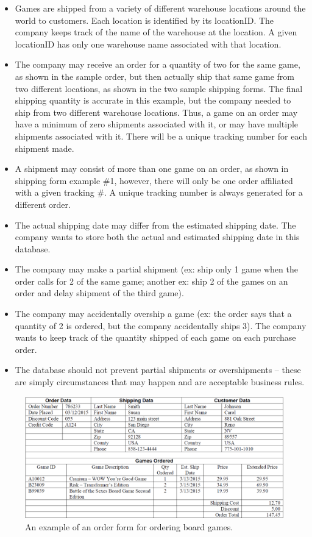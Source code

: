 \documentclass{article}
\begin{document}
\begin{itemize}
  \item Games are shipped from a variety of different warehouse locations around the world to customers. Each location is identified by its locationID. The company keeps track of the name of the warehouse at the location. A given locationID has only one warehouse name associated with that location.
  
  \item The company may receive an order for a quantity of two for the same game, as shown in the sample order, but then actually ship that same game from two different locations, as shown in the two sample shipping forms. The final shipping quantity is accurate in this example, but the company needed to ship from two different warehouse locations. Thus, a game on an order may have a minimum of zero shipments associated with it, or may have multiple shipments associated with it. There will be a unique tracking number for each shipment made.
  
  \item A shipment may consist of more than one game on an order, as shown in shipping form example \#1, however, there will only be one order affiliated with a given tracking \#. A unique tracking number is always generated for a different order.
  
  \item The actual shipping date may differ from the estimated shipping date. The company wants to store both the actual and estimated shipping date in this database.
  
  \item The company may make a partial shipment (ex: ship only 1 game when the order calls for 2 of the same game; another ex: ship 2 of the games on an order and delay shipment of the third game).
  
  \item The company may accidentally overship a game (ex: the order says that a quantity of 2 is ordered, but the company accidentally ships 3). The company wants to keep track of the quantity shipped of each game on each purchase order.
  
  \item The database should not prevent partial shipments or overshipments – these are simply circumstances that may happen and are acceptable business rules.
\end{itemize}

\begin{figure}[h!]
  \centering
  \includegraphics[width=.75\linewidth]{HW08_Ex01_order_form}
  \caption{An example of an order form for ordering board games.}
  \label{fig:HW08_Ex02_order_form}
\end{figure}
\end{document}
